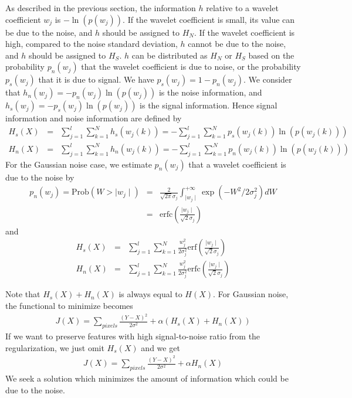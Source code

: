 \documentclass[11pt,a4paper]{article}
\begin{document}
As described in the previous section, the information $h$ relative to 
a wavelet coefficient $w_j$ is $- \ln(p(w_j))$. If the wavelet coefficient
is small, its value can be due to the noise, 
and  $h$ should be assigned to $H_N$.
If the wavelet coefficient is high, compared to the noise standard
deviation, $h$ cannot be due to the noise, and $h$ should be assigned to $H_S$.
$h$ can be distributed as $H_N$ or $H_S$ based on  the probability $p_n(w_j)$
that the wavelet coefficient is due to noise, or the probability 
$p_s(w_j)$ that it is due to 
signal.  We have $p_s(w_j) = 1 - p_n(w_j)$. We consider 
that  $h_n(w_j) = - p_n(w_j) \ln(p(w_j))$ is
the noise information, and 
$h_s(w_j) = - p_s(w_j) \ln(p(w_j))$ is the signal information. 
Hence  signal information and  noise information are defined by
\begin{eqnarray}
H_s(X) & = & \sum_{j=1}^{l}  \sum_{k=1}^{N} h_s(w_j(k)) = - \sum_{j=1}^{l}  
\sum_{k=1}^{N} p_s(w_j(k)) \ln ( p(w_j(k))) \\ \nonumber
H_n(X) & = & \sum_{j=1}^{l}  \sum_{k=1}^{N} h_n(w_j(k)) = - \sum_{j=1}^{l}  
\sum_{k=1}^{N} p_n(w_j(k)) \ln ( p(w_j(k)))
\end{eqnarray}
For the Gaussian noise case, we estimate $p_n(w_j)$ that a wavelet 
coefficient is due to the noise by
\begin{eqnarray}
p_n(w_j) = \mathrm{Prob}(W > \mid w_j \mid)  & =  & \frac{2}{\sqrt{2 \pi} 
\sigma_j} \int_{\mid w_j \mid}^{+\infty} \exp(-W^2/2\sigma^2_j) dW\\ \nonumber
 & = & \mbox{erfc}(\frac{\mid w_j \mid }{\sqrt{2}\sigma_j})
\end{eqnarray}
and
\begin{eqnarray}
H_s(X) &= & \sum_{j=1}^{l}  \sum_{k=1}^{N}  \frac{w_j^2}{2\sigma_j^2} 
\mbox{erf}(\frac{\mid w_j \mid }{\sqrt{2}\sigma_j}) \\ \nonumber
H_n(X) &= & \sum_{j=1}^{l}  \sum_{k=1}^{N}  \frac{w_j^2}{2\sigma_j^2} 
\mbox{erfc}(\frac{\mid w_j \mid }{\sqrt{2}\sigma_j}) 
\label{eq_entrop_result_1} 
\end{eqnarray}

Note that $H_s(X) + H_n(X)$ is always equal to $H(X)$. 
For Gaussian noise, the functional to minimize becomes
\begin{eqnarray}
J(X) = \sum_{pixels} \frac{{(Y-X)}^{2}}{2 {\sigma}^{2}} + {\alpha} (H_s(X)+H_n(X))
\end{eqnarray}
If we want to preserve features with high signal-to-noise ratio from the
regularization, we just omit $H_s(X)$ and we get
\begin{eqnarray}
J(X) = \sum_{pixels} \frac{{(Y-X)}^{2}}{2 {\sigma}^{2}} + {\alpha} H_n(X)
\end{eqnarray}
We seek a solution which minimizes the amount of information which could
be due to the noise.
\end{document}
